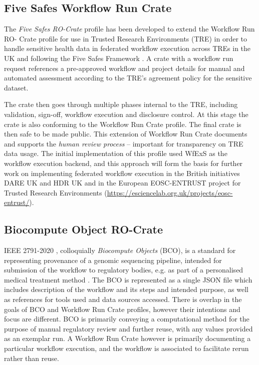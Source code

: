 \documentclass[10pt,letterpaper]{article}
\begin{document}
\subsection{Five Safes Workflow Run Crate}\label{trusted-workflow-run-crate}

The \emph{Five Safes RO-Crate} \cite{5s-crate} profile has been developed to extend the Workflow Run RO- Crate profile for use in Trusted Research Environments (TRE) in order to handle sensitive health data in federated workflow execution across TREs in the UK \cite{trefx} and following the Five Safes Framework \cite{Desai 2016}.
A crate with a workflow run request references a pre-approved workflow and project details for manual and automated assessment according to the TRE's agreement policy for the sensitive dataset. 

The crate then goes through multiple phases internal to the TRE, including validation, sign-off, workflow execution and disclosure control.
At this stage the crate is also conforming to the Workflow Run Crate profile.
The final crate is then safe to be made public.
This extension of Workflow Run Crate documents and supports the \emph{human review process} -- important for transparency on TRE data usage. 
The initial implementation of this profile used WfExS as the workflow execution backend, and this approach will form the basis for further work on implementing federated workflow execution in the British initiatives DARE UK and HDR UK \cite{Snowley 2023} and in the European EOSC-ENTRUST project for Trusted Research Environments (\url{https://esciencelab.org.uk/projects/eosc-entrust/}).


\subsection{Biocompute Object RO-Crate}\label{bco-crate}
IEEE 2791-2020 \cite{Mazumder 2020}, colloquially \emph{Biocompute Objects} (BCO), is a standard for representing provenance of a genomic sequencing pipeline, intended for submission of the workflow to regulatory bodies, e.g. as part of a personalised medical treatment method \cite{Alterovitz 2018}. 
The BCO is represented as a single JSON file which includes description of the workflow and its steps and intended purpose, as well as references for tools used and data sources accessed. 
There is overlap in the goals of BCO and Workflow Run Crate profiles, however their intentions and focus are different. 
BCO is primarily conveying a computational method for the purpose of manual regulatory review and further reuse, with any values provided as an exemplar run.  
A Workflow Run Crate however is primarily documenting a particular workflow execution, and the workflow is associated to facilitate rerun rather than reuse. 
\end{document}
